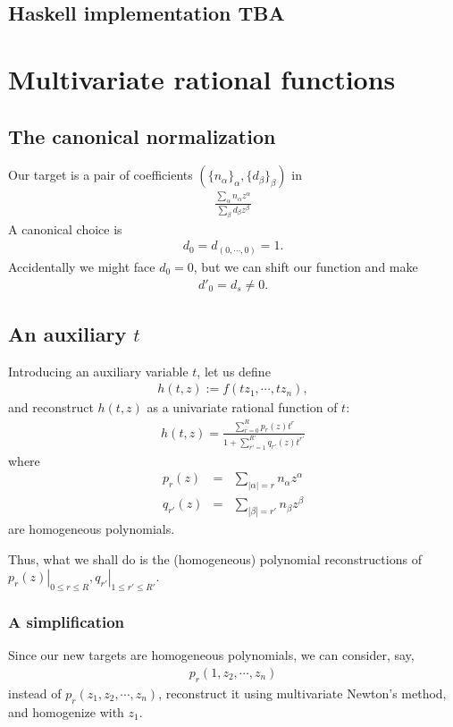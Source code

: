 \documentclass[11pt]{book}
\begin{document}
\subsection{Haskell implementation TBA}






\section{Multivariate rational functions}
\subsection{The canonical normalization}
Our target is a pair of coefficients $(\{ n_\alpha\}_\alpha, \{ d_\beta\}_\beta)$ in
\begin{eqnarray}
\frac{\sum_\alpha n_\alpha z^\alpha}{\sum_\beta d_\beta z^\beta}
\end{eqnarray}
A canonical choice is
\begin{eqnarray}
d_0 = d_{(0,\cdots,0)} = 1.
\end{eqnarray}
Accidentally we might face $d_0 = 0$, but we can shift our function and make
\begin{eqnarray}
d'_0 = d_{s} \neq 0.
\end{eqnarray}

\subsection{An auxiliary $t$}
Introducing an auxiliary variable $t$, let us define
\begin{eqnarray}
h(t,z) := f(tz_1, \cdots, tz_n),
\end{eqnarray}
and reconstruct $h(t,z)$ as a univariate rational function of $t$:
\begin{eqnarray}
h(t,z) = \frac{\sum_{r=0}^R p_r(z) t^r}{1+ \sum_{r'=1}^{R'} q_{r'}(z) t^{r'}}
\end{eqnarray}
where
\begin{eqnarray}
p_r(z) &=& \sum_{|\alpha| = r} n_\alpha z^\alpha \\
q_{r'}(z) &=& \sum_{|\beta| = r'} n_\beta z^\beta
\end{eqnarray}
are homogeneous polynomials.

Thus, what we shall do is the (homogeneous) polynomial reconstructions of $\left. p_r(z) \right|_{0 \leq r \leq R}, \left. q_{r'} \right|_{1 \leq r' \leq R'}$.

\subsubsection{A simplification}
Since our new targets are homogeneous polynomials, we can consider, say,
\begin{eqnarray}
p_r(1, z_2, \cdots, z_n)
\end{eqnarray}
instead of $p_r(z_1, z_2, \cdots, z_n)$, reconstruct it using multivariate Newton's method, and homogenize with $z_1$.
\end{document}
